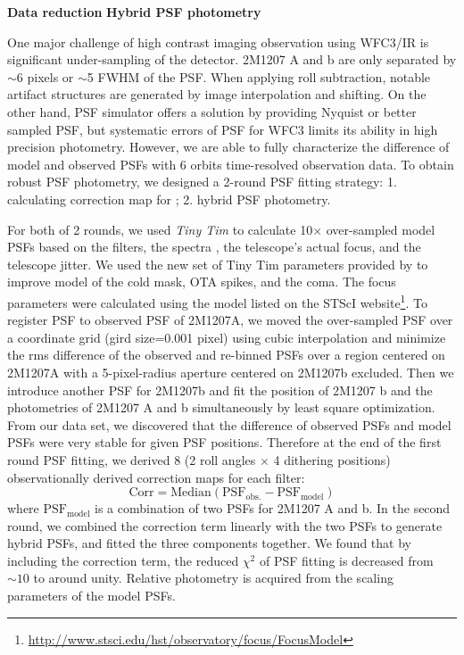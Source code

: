 \documentclass[12pt]{article}
\begin{document}
\textbf{Data reduction}
\textbf{Hybrid PSF photometry}

One major challenge of high contrast imaging observation using WFC3/IR
is significant under-sampling of the detector.  2M1207 A and b are
only separated by $\sim6$ pixels or $\sim$5 FWHM of the PSF. When
applying roll subtraction, notable artifact structures are generated
by image interpolation and shifting. On the other hand, \tinytim{} PSF
simulator\citep{Krist1995} offers a solution by providing Nyquist or better
sampled PSF, but systematic errors of \tinytim{} PSF for WFC3 limits
its ability in high precision photometry\citep{Biretta2014}. However,
we are able to fully characterize the difference of model and observed
PSFs with 6 orbits time-resolved observation data. To obtain robust \tinytim{} PSF
photometry, we designed a 2-round PSF fitting strategy: 1. calculating
correction map for \tinytim{}; 2. hybrid PSF photometry.

For both of 2 rounds, we used {\em Tiny Tim} to calculate 10$\times$
over-sampled model PSFs based on the filters, the spectra 
\citep{Bonnefoy2014, Patience2010}, the telescope's actual focus, and
the telescope jitter.  We used the new set of Tiny Tim parameters
provided by \cite{Biretta2014} to improve model of the cold mask,
OTA spikes, and the coma. The focus parameters were calculated
using the model listed on the STScI
website\footnote{\url{http://www.stsci.edu/hst/observatory/focus/FocusModel}}. To
register \tinytim{} PSF to observed PSF of 2M1207A, we moved the
over-sampled PSF over a coordinate grid (gird size=0.001 pixel) using
cubic interpolation and minimize the rms difference of the
observed and re-binned \tinytim{} PSFs over a region centered on 2M1207A with a
5-pixel-radius aperture centered on 2M1207b excluded. Then we introduce
another \tinytim{} PSF for 2M1207b and  fit the
position of 2M1207 b and the photometries of 2M1207 A and b simultaneously
by least square optimization. From our data set, we discovered that
the difference of observed PSFs and model PSFs were very stable for
given PSF positions. Therefore at the end of the first round PSF
fitting, we derived 8 (2 roll angles $\times$ 4 dithering positions)
observationally derived correction maps for each filter:
\begin{equation}
  \mathrm{Corr = Median(PSF_{obs.} - PSF_{model} )}
\end{equation}
where $\mathrm{PSF_{model}}$ is a combination of two \tinytim{} PSFs
for 2M1207 A and b. In the second round, we combined the correction
term linearly with the two \tinytim{} PSFs to generate hybrid PSFs,
and fitted the three components together. We found that by including the correction term,
the reduced $\chi^{2}$ of PSF fitting is decreased from $\sim 10$ to
around unity. Relative photometry is acquired from the scaling
parameters of the model PSFs.
\end{document}
